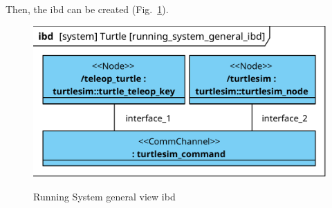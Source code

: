 \documentclass[11pt,oneside,a4paper]{report}
\begin{document}
Then, the ibd can be created (Fig.~\ref{fig:running_system_general_ibd}). 

\begin{figure}[H]
	\centering
	\begin{center}
		{\includegraphics[scale=1.0]{diagrams/running_system_general_ibd.png}}
	\end{center}
	\caption{Running System general view ibd}
	\label{fig:running_system_general_ibd}
\end{figure}
			
\AtNextBibliography{\small}
\printbibliography
	
\end{document}

